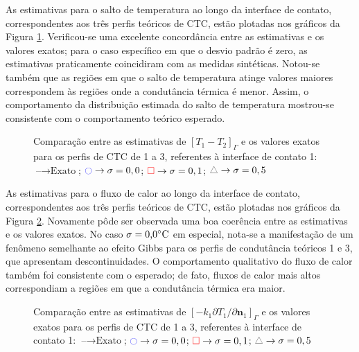 As estimativas para o salto de temperatura ao longo da interface de contato, correspondentes aos três perfis teóricos de CTC, estão plotadas nos gráficos da Figura \ref{figura_delta_temperaturas_interface_01}. Verificou-se uma excelente concordância entre as estimativas e os valores exatos; para o caso específico em que o desvio padrão é zero, as estimativas praticamente coincidiram com as medidas sintéticas. Notou-se também que as regiões em que o salto de temperatura atinge valores maiores correspondem às regiões onde a condutância térmica é menor. Assim, o comportamento da distribuição estimada do salto de temperatura mostrou-se consistente com o comportamento teórico esperado.
\begin{figure}[h!b]
	\caption{Comparação entre as estimativas de $[T_1 - T_2]_\Gamma$ e os valores exatos para os perfis de CTC de 1 a 3, referentes à interface de contato 1: $\text{--} \rightarrow \text{Exato}$; $\textcolor{blue}{\ocircle} \rightarrow \sigma = 0,0$; $\textcolor{red}{\square} \rightarrow \sigma = 0,1$; $\textcolor{gray}{\triangle} \rightarrow \sigma = 0,5$}
	\label{figura_delta_temperaturas_interface_01}
\end{figure}

As estimativas para o fluxo de calor ao longo da interface de contato, correspondentes aos três perfis teóricos de CTC, estão plotadas nos gráficos da Figura \ref{figura_fluxo_calor_interface_01}. Novamente pôde ser observada uma boa coerência entre as estimativas e os valores exatos. No caso $\sigma = \text{0,0}\celsius$ em especial, nota-se a manifestação de um fenômeno semelhante ao efeito Gibbs\citep{livro_boyce} para os perfis de condutância teóricos 1 e 3, que apresentam descontinuidades. O comportamento qualitativo do fluxo de calor também foi consistente com o esperado; de fato, fluxos de calor mais altos correspondiam a regiões em que a condutância térmica era maior.
 
\begin{figure}[h!b]
	\caption{Comparação entre as estimativas de $[-k_1 {\partial T_1}/{\partial\mathbf{n}_1}]_\Gamma$ e os valores exatos para os perfis de CTC de 1 a 3, referentes à interface de contato 1: $\text{--} \rightarrow \text{Exato}$; $\textcolor{blue}{\ocircle} \rightarrow \sigma = 0,0$; $\textcolor{red}{\square} \rightarrow \sigma = 0,1$; $\textcolor{gray}{\triangle} \rightarrow \sigma = 0,5$}
	\label{figura_fluxo_calor_interface_01}
\end{figure}

